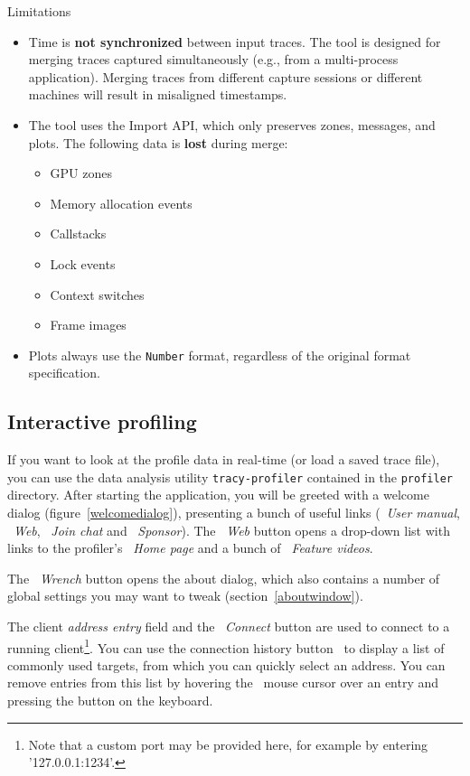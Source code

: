 \documentclass[hidelinks,titlepage,a4paper,twoside]{article}
\begin{document}
\begin{bclogo}[
noborder=true,
couleur=black!5,
logo=\bcattention
]{Limitations}
\begin{itemize}
\item Time is \textbf{not synchronized} between input traces. The tool is designed for merging traces captured simultaneously (e.g., from a multi-process application). Merging traces from different capture sessions or different machines will result in misaligned timestamps.
\item The tool uses the Import API, which only preserves zones, messages, and plots. The following data is \textbf{lost} during merge:
  \begin{itemize}
    \item GPU zones
    \item Memory allocation events
    \item Callstacks
    \item Lock events
    \item Context switches
    \item Frame images
  \end{itemize}
\item Plots always use the \texttt{Number} format, regardless of the original format specification.
\end{itemize}
\end{bclogo}

\subsection{Interactive profiling}
\label{interactiveprofiling}

If you want to look at the profile data in real-time (or load a saved trace file), you can use the data analysis utility \texttt{tracy-profiler} contained in the \texttt{profiler} directory. After starting the application, you will be greeted with a welcome dialog (figure~\ref{welcomedialog}), presenting a bunch of useful links (\faBook{}~\emph{User manual}, \faEarthAmericas{}~\emph{Web}, \faComments~\emph{Join chat} and \faHeart{}~\emph{Sponsor}). The \faEarthAmericas{}~\emph{Web} button opens a drop-down list with links to the profiler's \emph{\faHouseChimney{}~Home page} and a bunch of \emph{\faVideo{}~Feature videos}.

The \emph{\faWrench{}~Wrench} button opens the about dialog, which also contains a number of global settings you may want to tweak (section~\ref{aboutwindow}).

The client \emph{address entry} field and the \faWifi{}~\emph{Connect} button are used to connect to a running client\footnote{Note that a custom port may be provided here, for example by entering '127.0.0.1:1234'.}. You can use the connection history button~\faCaretDown{} to display a list of commonly used targets, from which you can quickly select an address. You can remove entries from this list by hovering the \faArrowPointer{}~mouse cursor over an entry and pressing the \keys{\del} button on the keyboard.
\end{document}
